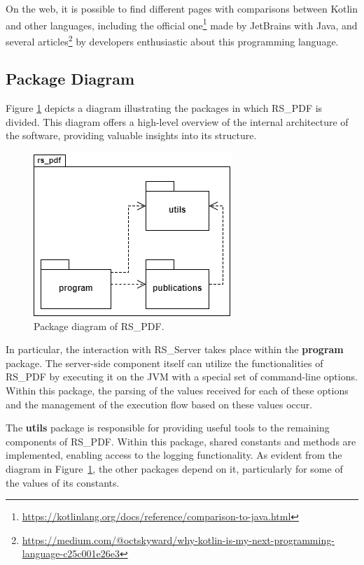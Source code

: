 \documentclass[a4paper, english]{article}
\newcommand{\rsserver}{RS\_Server\xspace}
\newcommand{\rspdf}{RS\_PDF\xspace}
\begin{document}
On the web, it is possible to find different pages with comparisons between Kotlin and other languages, including the official one\footnote{\url{https://kotlinlang.org/docs/reference/comparison-to-java.html}} made by JetBrains with Java, and several articles\footnote{\url{https://medium.com/@octskyward/why-kotlin-is-my-next-programming-language-c25c001e26e3}} by developers enthusiastic about this programming language.

\subsection{Package Diagram}

Figure \ref{fig:package} depicts a diagram illustrating the packages in which \rspdf is divided. This diagram offers a high-level overview of the internal architecture of the software, providing valuable insights into its structure.

\begin{figure}[!tbp]
\centering
\includegraphics[scale=0.7]{figures/package.png}
\caption{Package diagram of \rspdf.}
\label{fig:package}
\end{figure}

In particular, the interaction with \rsserver takes place within the \textbf{program} package. The server-side component itself can utilize the functionalities of \rspdf by executing it on the JVM with a special set of command-line options. Within this package, the parsing of the values received for each of these options and the management of the execution flow based on these values occur.

The \textbf{utils} package is responsible for providing useful tools to the remaining components of \rspdf. Within this package, shared constants and methods are implemented, enabling access to the logging functionality. As evident from the diagram in Figure~\ref{fig:package}, the other packages depend on it, particularly for some of the values of its constants.
\end{document}
